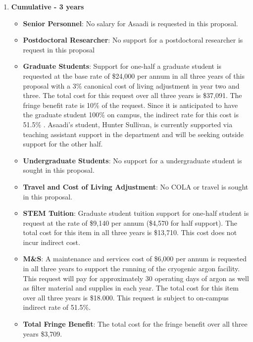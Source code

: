 \begin{enumerate}

\item[]{\textbf{Cumulative - 3 years}}

\begin{itemize}[noitemsep,nolistsep]
\item{{\bf Senior Personnel}: No salary for Asaadi is requested in this proposal.}

\item {{\bf Postdoctoral Researcher}: No support for a postdoctoral researcher is request in this proposal } 

\item{{\bf Graduate Students}: Support for one-half a graduate student is requested at the base rate of \$24,000 per annum in all three years of this proposal with a 3\% canonical cost of living adjustment in year two and three. The total cost for this request over all three years is \$37,091.  The fringe benefit rate is 10\% of the request.  Since it is anticipated to have the graduate student 100\% on campus, the indirect rate for this cost is 51.5\% . Asaadi’s student, Hunter Sullivan, is currently supported via teaching assistant support in the department and will be seeking outside support for the other half. }

\item {{\bf Undergraduate Students}: No support for a undergraduate student is sought in this proposal.}

\item{{\bf Travel and Cost of Living Adjustment}: No COLA or travel is sought in this proposal.}

\item {{\bf STEM Tuition}: Graduate student tuition support for one-half student is request at the rate of \$9,140 per annum (\$4,570 for half support). The total cost for this item in all three years is \$13,710.  This cost does not incur indirect cost.}

\item {{\bf M\&S}: A maintenance and services cost of \$6,000 per annum is requested in all three years to support the running of the cryogenic argon facility. This request will pay for approximately 30 operating days of argon as well as filter material and supplies in each year. The total cost for this item over all three years is \$18.000.  This request is subject to on-campus indirect rate of 51.5\%.}

\item {{\bf Total Fringe Benefit}: The total cost for the fringe benefit over all three years \$3,709.}


\end{itemize}
\end{enumerate}
